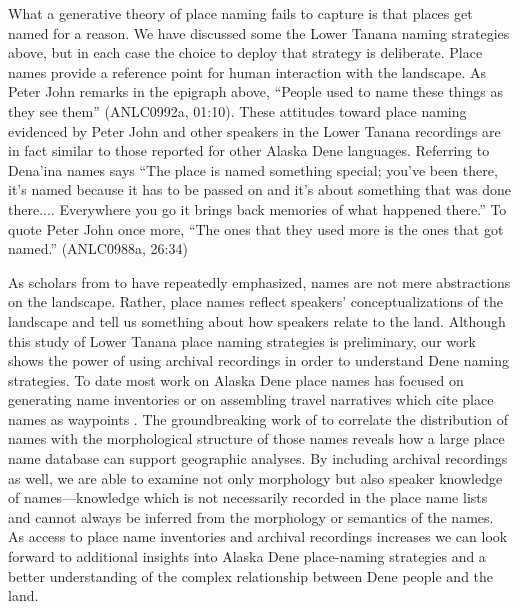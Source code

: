 What a generative theory of place naming fails to capture is that places get named for a reason. We have discussed some the Lower Tanana naming strategies above, but in each case the choice to deploy that strategy is deliberate. Place names provide a reference point for human interaction with the landscape. As Peter John remarks in the epigraph above, “People used to name these things as they see them” (ANLC0992a, 01:10). These attitudes toward place naming evidenced by Peter John and other speakers  in the Lower Tanana recordings are in fact similar to those reported for other Alaska Dene languages. Referring to Dena’ina names \citet[15]{evanoff2010} says “The place is named something special; you’ve been there, it’s named because it has to be passed on and it’s about something that was done there.... Everywhere you go it brings back memories of what happened there.” To quote Peter John once more, “The ones that they used more is the ones that got named.” (ANLC0988a, 26:34)



As scholars from \citet{boas1934} to  \citet{basso1988} have repeatedly emphasized, names are not mere abstractions on the landscape. Rather, place names reflect speakers’ conceptualizations of the landscape and tell us something about how speakers relate to the land. Although this study of Lower Tanana place naming strategies is preliminary, our work shows the power of using archival recordings in order to understand Dene naming strategies. To date most work on Alaska Dene place names has focused on generating name inventories or on assembling travel narratives which cite place names as waypoints \citep[e.g.,][]{kari2010}. The groundbreaking work of \citet{kari1996a} to correlate the distribution of names with the morphological structure of those names reveals how a large place name database can support geographic analyses. By including archival recordings as well, we are able to examine not only morphology but also speaker knowledge of names---knowledge which is not necessarily recorded in the place name lists and cannot always be inferred from the morphology or semantics of the names. As access to place name inventories and archival recordings increases we can look forward to additional insights into Alaska Dene place-naming strategies and a better understanding of the complex relationship between Dene people and the land.





\label{holton-ch-end}
